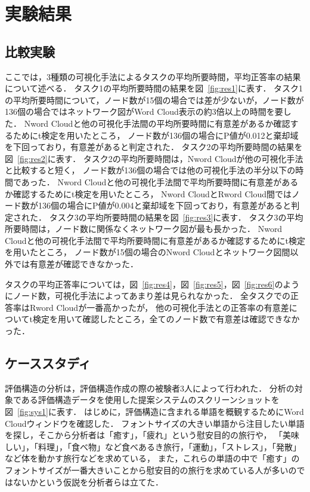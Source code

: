 \documentclass[syuuron]{kuee}
\begin{document}
\chapter{実験結果}
	\section{比較実験}
	ここでは，3種類の可視化手法によるタスクの平均所要時間，平均正答率の結果について述べる．
	タスク1の平均所要時間の結果を図~\ref{fig:res1}に表す．
	タスク1の平均所要時間について，ノード数が15個の場合では差が少ないが，ノード数が136個の場合ではネットワーク図がWord Cloud表示の約3倍以上の時間を要した．
	Nword Cloudと他の可視化手法間の平均所要時間に有意差があるか確認するためにt検定を用いたところ，
	ノード数が136個の場合にP値が0.012と棄却域を下回っており，有意差があると判定された．
	タスク2の平均所要時間の結果を図~\ref{fig:res2}に表す．
	タスク2の平均所要時間は，Nword Cloudが他の可視化手法と比較すると短く，
	ノード数が136個の場合では他の可視化手法の半分以下の時間であった．
	Nword Cloudと他の可視化手法間で平均所要時間に有意差があるか確認するためにt検定を用いたところ，
	Nword CloudとRword Cloud間ではノード数が136個の場合にP値が0.004と棄却域を下回っており，有意差があると判定された．
	タスク3の平均所要時間の結果を図~\ref{fig:res3}に表す．
	タスク3の平均所要時間は，ノード数に関係なくネットワーク図が最も長かった．
	Nword Cloudと他の可視化手法間で平均所要時間に有意差があるか確認するためにt検定を用いたところ，
	ノード数が15個の場合のNword Cloudとネットワーク図間以外では有意差が確認できなかった．
	
	タスクの平均正答率については，図~\ref{fig:res4}，図~\ref{fig:res5}，図~\ref{fig:res6}のようにノード数，可視化手法によってあまり差は見られなかった．
	全タスクでの正答率はRword Cloudが一番高かったが，
	他の可視化手法との正答率の有意差についてt検定を用いて確認したところ，全てのノード数で有意差は確認できなかった．
		
	\section{ケーススタディ}
	評価構造の分析は，評価構造作成の際の被験者3人によって行われた．
	分析の対象である評価構造データを使用した提案システムのスクリーンショットを図~\ref{fig:sys1}に表す．
	はじめに，評価構造に含まれる単語を概観するためにWord Cloudウィンドウを確認した．
	フォントサイズの大きい単語から注目したい単語を探し，そこから分析者は「癒す」，「疲れ」という慰安目的の旅行や，
	「美味しい」，「料理」，「食べ物」など食べあるき旅行，「運動」，「ストレス」，「発散」など体を動かす旅行などを求めている，
	また，これらの単語の中で「癒す」のフォントサイズが一番大きいことから慰安目的の旅行を求めている人が多いのではないかという仮説を分析者らは立てた．
	
\end{document}
